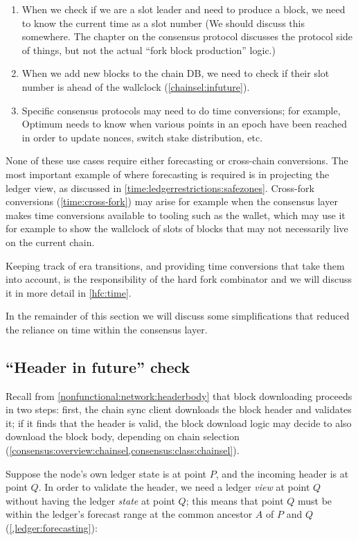 \begin{enumerate}
\item When we check if we are a slot leader and need to produce a block, we
need to know the current time as a slot number (We should discuss
this somewhere. The chapter on the consensus protocol discusses the protocol
side of things, but not the actual ``fork block production'' logic.)
\item When we add new blocks to the chain DB, we need to check if their slot
number is ahead of the wallclock (\cref{chainsel:infuture}).
\item Specific consensus protocols may need to do time conversions; for example,
Optimum needs to know when various points in an epoch have been reached in order
to update nonces, switch stake distribution, etc.
\end{enumerate}

None of these use cases require either forecasting or cross-chain conversions.
The most important example of where forecasting is required is in projecting
the ledger view, as discussed in \cref{time:ledgerrestrictions:safezones}.
Cross-fork conversions (\cref{time:cross-fork}) may arise for example when the consensus layer makes time conversions available to tooling such as the wallet,
which may use it for example to show the wallclock of slots of blocks that may
not necessarily live on the current chain.

Keeping track of era transitions, and providing time conversions that take
them into account, is the responsibility of the hard fork combinator and
we will discuss it in more detail in \cref{hfc:time}.

In the remainder of this section we will discuss some simplifications
that reduced the reliance on time within the consensus layer.

\subsection{``Header in future'' check}
\label{time:header-infuture-check}

Recall from \cref{nonfunctional:network:headerbody} that block downloading
proceeds in two steps: first, the chain sync client downloads the block header
and validates it; if it finds that the header is valid, the block download logic
may decide to also download the block body, depending on chain selection
(\cref{consensus:overview:chainsel,consensus:class:chainsel}).

Suppose the node's own ledger state is at point $P$, and the incoming header is
at point $Q$. In order to validate the header, we need a ledger \emph{view} at
point $Q$ without having the ledger \emph{state} at point $Q$; this means that
point $Q$ must be within the ledger's forecast range at the common ancestor $A$
of $P$ and $Q$ (\cref{,ledger:forecasting}):

